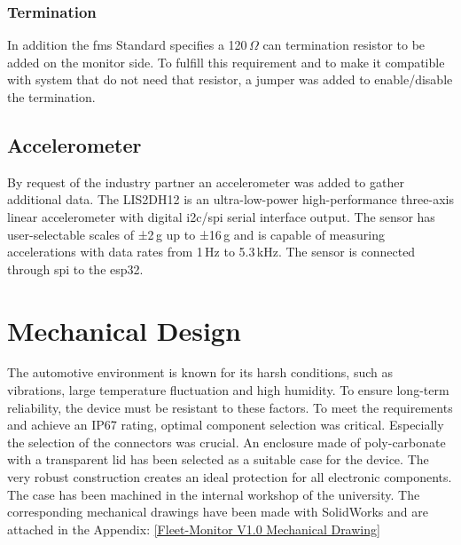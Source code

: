 \subsubsection{Termination}
In addition the \acrshort{fms} Standard specifies a 120\,$\Omega$ \acrshort{can} termination resistor to be added on the monitor side. To fulfill this requirement and to make it compatible with system that do not need that resistor, a jumper was added to enable/disable the termination.   

\subsection{Accelerometer}
By request of the industry partner an accelerometer was added to gather additional data. The LIS2DH12 is an ultra-low-power high-performance three-axis linear accelerometer with digital \acrshort{i2c}/\acrshort{spi} serial interface output. The sensor has user-selectable scales of ±2\,g up to ±16\,g and is capable of measuring accelerations with data rates from 1\,Hz to 5.3\,kHz. The sensor is connected through \acrshort{spi} to the \gls{esp32}.

\newpage
\section{Mechanical Design}
The automotive environment is known for its harsh conditions, such as vibrations, large temperature fluctuation and high humidity. To ensure long-term reliability, the device must be resistant to these factors. To meet the requirements and achieve an IP67 rating, optimal component selection was critical. Especially the selection of the connectors was crucial. \newline
An enclosure made of poly-carbonate with a transparent lid has been selected as a suitable case for the device. The very robust construction creates an ideal protection for all electronic components.\newline
The case has been machined in the internal workshop of the university. The corresponding mechanical drawings have been made with SolidWorks and are attached in the Appendix: \ref{Fleet-Monitor V1.0 Mechanical Drawing}

